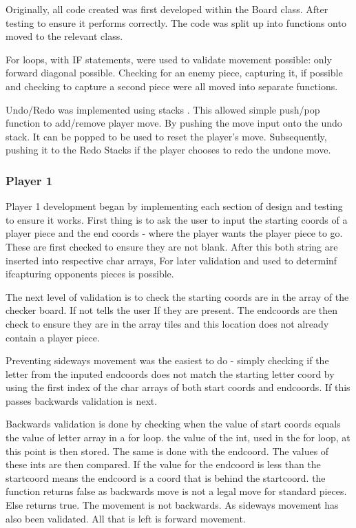 \documentclass[10pt, a4paper]{article}
\begin{document}
    Originally, all code created was first developed within the Board class. After testing to ensure it performs correctly. The code was split up into functions onto moved to the relevant class.
    
    For loops, with IF statements, were used to validate movement possible: only forward diagonal possible. Checking for an enemy piece, capturing it, if possible and checking to capture a second piece were all moved into separate functions.
    
    Undo/Redo was implemented using stacks . This allowed simple push/pop function to add/remove player move. By pushing the move input onto the undo stack. It can be popped to be used to reset the player's move. Subsequently, pushing it to the Redo Stacks if the player chooses to redo the undone move.    
    \subsubsection{Player 1}
    Player 1 development began by implementing each section of design and testing to ensure it works. First thing is to ask the user to input the starting coords of a player piece and the end coords - where the player wants the player piece to go.
    These are first checked to ensure they are not blank. After this both string are inserted into respective char arrays, For later validation and used to determinf ifcapturing opponents pieces is possible.
    
    The next level of validation is to check the starting coords are in the array of the checker board. If not tells the user If they are present. The endcoords are then check to ensure they are in the array tiles and this location does not already contain a player piece.
    
    Preventing sideways movement was the easiest to do - simply checking if the letter from the inputed endcoords does not match the starting letter coord by using the first index of the char arrays of both start coords and endcoords. If this passes backwards validation is next.
    
    Backwards validation is done by checking when the value of start coords equals the value of letter array in a for loop. the value of the int, used in the for loop, at this point is then stored. The same is done with the endcoord. The values of these ints are then  compared. If the value for the endcoord is less than the startcoord means the endcoord is a coord that is behind the startcoord. the function returns false as backwards move is not a legal move for standard pieces. Else returns true. The movement is not backwards. As sideways movement has also been validated. All that is left is forward movement.
    
\end{document}
